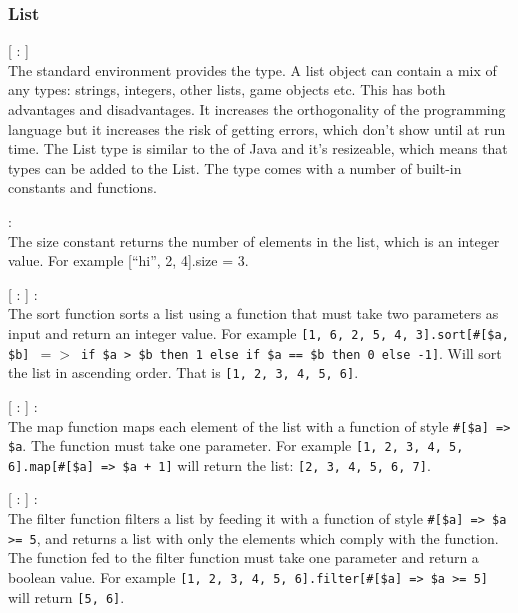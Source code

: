 \subsubsection{List}

\begin{dlist}
  \item {}[ : ]\\
    The standard environment provides the  type. A list object can contain a mix of any types: strings, integers, other lists, game objects etc.
  This has both advantages and disadvantages. It increases the orthogonality of the programming language but it increases the risk of getting
  errors, which don't show until at run time. The List type is similar to the  of Java and it's resizeable, which means that types can be added to the List. The type comes with a number of built-in constants and functions. 
  \item {} : \\
  The size constant returns the number of elements in the list, which is an integer value. For example [``hi'', 2, 4].size = 3.
  \item {}[ : ] :  \\
    The sort function sorts a list using a function that must take two parameters as input and return an integer value. For example \texttt{[1, 6, 2, 5, 4, 3].sort[\#[\$a, \$b] $=>$ if \$a > \$b then 1 else if \$a == \$b then 0 else -1]}. Will sort the list in ascending order. That is \texttt{[1, 2, 3, 4, 5, 6]}.
  \item {}[ : ] :  \\
    The map function maps each element of the list with a function of style \texttt{\#[\$a] => \$a}. The function must take one parameter. For example \texttt{[1, 2, 3, 4, 5, 6].map[\#[\$a] => \$a + 1]} will return the list: \texttt{[2, 3, 4, 5, 6, 7]}.
  \item {}[ : ] :  \\
    The filter function filters a list by feeding it with a function of style \texttt{\#[\$a] => \$a >= 5}, and returns a list with only the elements which comply with the function. The function fed to the filter function must take one parameter and return a boolean value. For example \texttt{[1, 2, 3, 4, 5, 6].filter[\#[\$a] => \$a >= 5]} will return \texttt{[5, 6]}. 
\end{dlist}

